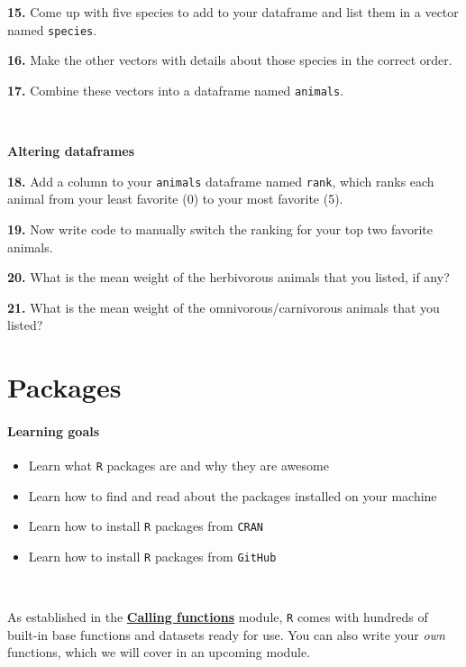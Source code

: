 \documentclass[
]{book}
\providecommand{\tightlist}{%
  \setlength{\itemsep}{0pt}\setlength{\parskip}{0pt}}
\begin{document}
\textbf{15.} Come up with five species to add to your dataframe and list them in a vector named \texttt{species}.

\textbf{16.} Make the other vectors with details about those species in the correct order.

\textbf{17.} Combine these vectors into a dataframe named \texttt{animals}.

~

\textbf{Altering dataframes}

\textbf{18.} Add a column to your \texttt{animals} dataframe named \texttt{rank}, which ranks each animal from your least favorite (0) to your most favorite (5).

\textbf{19.} Now write code to manually switch the ranking for your top two favorite animals.

\textbf{20.} What is the mean weight of the herbivorous animals that you listed, if any?

\textbf{21.} What is the mean weight of the omnivorous/carnivorous animals that you listed?

\hypertarget{packages}{%
\chapter{Packages}\label{packages}}

\hypertarget{learning-goals-6}{%
\subsubsection*{Learning goals}\label{learning-goals-6}}

\begin{itemize}
\tightlist
\item
  Learn what \texttt{R} packages are and why they are awesome
\item
  Learn how to find and read about the packages installed on your machine
\item
  Learn how to install \texttt{R} packages from \texttt{CRAN}
\item
  Learn how to install \texttt{R} packages from \texttt{GitHub}
\end{itemize}

~

As established in the \protect\hyperlink{calling_functions}{\textbf{Calling functions}} module, \texttt{R} comes with hundreds of built-in base functions and datasets ready for use. You can also write your \emph{own} functions, which we will cover in an upcoming module.
\end{document}
